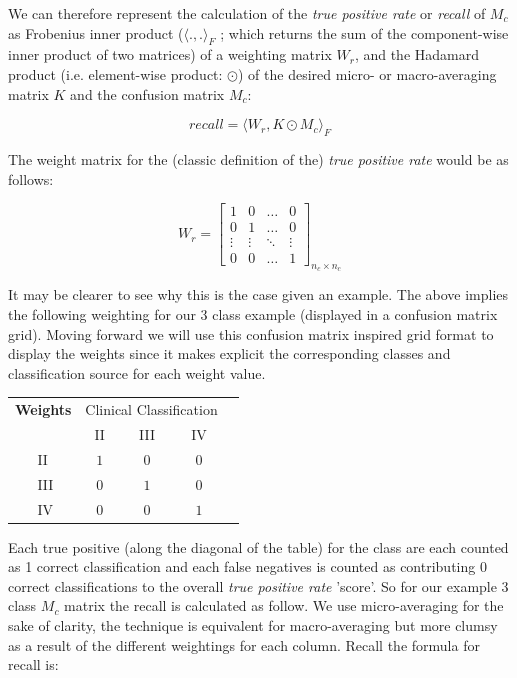 \documentclass[]{article}
\begin{document}
\noindent We can therefore represent the calculation of the \textit{true positive rate} or \textit{recall} of $M_c$ as Frobenius inner product ($\langle.,.\rangle_F$ ; which returns the sum of the component-wise inner product of two matrices) of a weighting matrix $W_r$, and the Hadamard product (i.e. element-wise product: $\odot$) of the desired micro- or macro-averaging matrix $K$ and the confusion matrix $M_c$:

\begin{equation}
\textit{recall} = \langle W_r, K \odot M_c \rangle_F
\end{equation}

\noindent The weight matrix for the (classic definition of the) \textit{true positive rate} would be as follows:

\[
W_r = \begin{bmatrix}
1 & 0 & \dots  & 0 \\
0 & 1 & \dots  & 0 \\
\vdots & \vdots & \ddots & \vdots \\
0 & 0 & \dots & 1
\end{bmatrix}_{n_c\times n_c}
\]

\noindent It may be clearer to see why this is the case given an example. The above implies the following weighting for our 3 class example (displayed in a confusion matrix grid). Moving forward we will use this confusion matrix inspired grid format to display the weights since it makes explicit the corresponding classes and classification source for each weight value.

\begin{center}
	\begin{tabular}{l|l|c|c|c|c}
		\multicolumn{2}{c}{\textbf{Weights}}&\multicolumn{3}{c}{Clinical Classification}\\
		\cline{3-5}
		\multicolumn{2}{c|}{}&II&III&IV\\
		\cline{2-5}
		\multirow{5}{0.8cm}{\rotatebox{90}{\parbox{0.8cm}{\centering Algorithm \\ Classification}}} %
		& II & $1$ & $0$ & $0$\\
		\cline{2-5}
		& III & $0$ & $1$ & $0$\\
		\cline{2-5}
		& IV & $0$ & $0$ & $1$\\
		\cline{2-5}
	\end{tabular}
\end{center}

Each true positive (along the diagonal of the table) for the class are each counted as 1 correct classification and each false negatives is counted as contributing 0 correct classifications to the overall \textit{true positive rate} 'score'. So for our example 3 class $M_c$ matrix the recall is calculated as follow. We use micro-averaging for the sake of clarity, the technique is equivalent for macro-averaging but more clumsy as a result of the different weightings for each column. Recall the formula for recall is:
\end{document}
